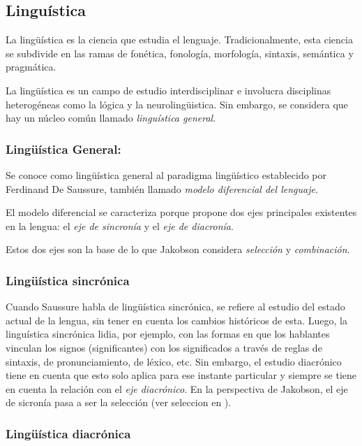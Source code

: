 \documentclass[12pt,letterpaper,twoside]{article}
\begin{document}
\subsection{Linguística}
\label{sec:orgbad1d94}

La lingüística es la ciencia que estudia el lenguaje.
Tradicionalmente, esta ciencia se subdivide en las ramas de fonética,
fonología, morfología, sintaxis, semántica y pragmática. \cite{gelbukh2004}

La lingüística es un campo de estudio interdisciplinar e involucra
disciplinas heterogéneas como la lógica y la neurolingüistica. Sin
embargo, se considera que hay un núcleo común llamado \emph{linguística
general}.

\subsubsection{Lingüística General:}
\label{sec:org5b51deb}

Se conoce como lingüística general al paradigma lingüístico
establecido por Ferdinand De Saussure, también llamado \emph{modelo
diferencial del lenguaje}.

El modelo diferencial se caracteriza porque propone dos ejes
principales existentes en la lengua: el \emph{eje de sincronía} y el
\emph{eje de diacronía}.\cite{alonso1945curso}

Estos dos ejes son la base de lo que Jakobson considera \emph{selección} y
\emph{combinación}.


\subsubsection{Lingüística sincrónica}
\label{sec:orgbe05c5a}

Cuando Saussure habla de lingüística sincrónica, se refiere al
estudio del estado actual de la lengua, sin tener en cuenta los
cambios históricos de esta. Luego, la linguística sincrónica lidia,
por ejemplo, con las formas en que los hablantes vinculan los
signos (significantes) con los significados a través de reglas de
sintaxis, de pronunciamiento, de léxico, etc. Sin embargo, el
estudio diacrónico tiene en cuenta que esto solo aplica para
ese instante particular y siempre se tiene en cuenta la relación
con el \emph{eje diacrónico}. En la perspectiva de Jakobson, el eje de
sicronía pasa a ser la selección (ver seleccion en ).

\subsubsection{Lingüística diacrónica}
\label{sec:orgd3c7e72}
\end{document}
